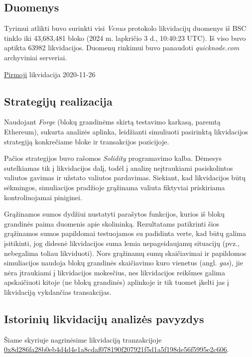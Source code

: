 \documentclass[]{VUMIFTemplateClass}
\begin{document}
\subsection{Duomenys}

Tyrimui atlikti buvo surinkti visi \textit{Venus} protokolo likvidacijų duomenys iš BSC tinklo iki 43,683,481 bloko (2024 m. lapkričio 3 d., 10:40:23 UTC). Iš viso buvo aptikta 63982 likvidacijos. Duomenų rinkimui buvo panaudoti \textit{quicknode.com} archyviniai serveriai.

\href{https://bscscan.com/tx/0x2434f5aee00e1135c66fb42203d506351ed2b6629e01af5daee37f652e4d67b8}{Pirmoji}
likvidacija 2020-11-26

\subsection{Strategijų realizacija}

Naudojant \textit{Forge} (blokų grandinėms skirtą testavimo karkasą, paremtą Ethereum), sukurta analizės aplinka, leidžianti simuliuoti pasirinktą likvidacijos strategiją konkrečiame bloke ir transakcijos pozicijoje.

Pačios strategijos buvo rašomos \textit{Solidity} programavimo kalba. Dėmesys sutelkiamas tik į likvidacijos dalį, todėl į analizę neįtraukiami pasiskolintos valiutos gavimas ir užstato valiutos pardavimas. Siekiant, kad likvidacijos būtų sėkmingos, simuliacijos pradžioje grąžinama valiuta fiktyviai priskiriama kontroliuojamai piniginei.

Grąžinamos sumos dydžiui nustatyti parašytos funkcijos, kurios iš blokų grandinės paima duomenis apie skolininką. Rezultatams patikrinti šios grąžinamos sumos papildomai testuojamos su padidinta verte, kad būtų galima įsitikinti, jog didesnė likvidacijos suma lemia nepageidaujamų situacijų (pvz., nebegalima toliau likviduoti). Nors grąžinamų sumų skaičiavimai ir papildomos simuliacijos naudoja blokų grandinės skaičiavimo kuro vienetus (angl. \textit{gas}), jie nėra įtraukiami į likvidacijos mokesčius, nes likvidacijos reikšmes galima apskaičiuoti kitoje (ne blokų grandinės)  aplinkoje ir tik tuomet įkelti jas į likvidaciją vykdančias transakcijas.

\subsection{Istorinių likvidacijų analizės pavyzdys}

\small
Šiame skyriuje nagrinėsime likvidaciją tranzakcijoje \\\href{https://app.blocksec.com/explorer/tx/bsc/0x8d286fa28b0eb4d4d4e1a8cdaf078190f207921f5d1a5f198de56f5995e2c606}{0x8d286fa28b0eb4d4d4e1a8cdaf078190f207921f5d1a5f198de56f5995e2c606}.
\end{document}
